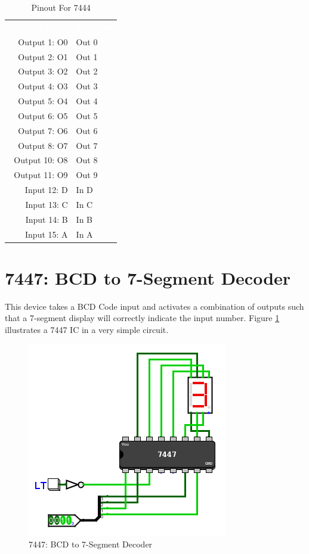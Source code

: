 \begin{table}[H]
	\sffamily
	\newcommand{\head}[1]{\textcolor{white}{\textbf{#1}}}		
	\begin{center}
		\begin{tabular}{rl} 
			\rowcolor{black!75}
			\head{Logisim Label} & \head{Function} \\
			Output 1: O0  & Out 0 \\
			Output 2: O1  & Out 1 \\
			Output 3: O2  & Out 2 \\
			Output 4: O3  & Out 3 \\
			Output 5: O4  & Out 4 \\
			Output 6: O5  & Out 5 \\
			Output 7: O6  & Out 6 \\
			Output 8: O7  & Out 7 \\
			Output 10: O8 & Out 8 \\
			Output 11: O9 & Out 9 \\
			Input 12: D   & In D  \\
			Input 13: C   & In C  \\
			Input 14: B   & In B  \\
			Input 15: A   & In A  \\
		\end{tabular}
	\end{center}
	\caption{Pinout For 7444}
	\label{tab:50-7444b}
\end{table}

\section{7447: BCD to 7-Segment Decoder}

This device takes a BCD Code input and activates a combination of outputs such that a 7-segment display will correctly indicate the input number. Figure \ref{fig:app_ttl-7447} illustrates a 7447 \ac{IC} in a very simple circuit.

\begin{figure}[H]
	\centering
	\includegraphics{gfx/app_ttl-7447}
	\caption{7447: BCD to 7-Segment Decoder}
	\label{fig:app_ttl-7447}
\end{figure}

